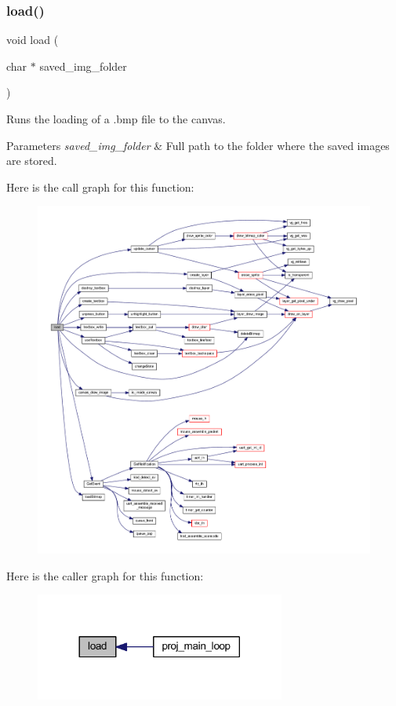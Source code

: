 \subsubsection{\texorpdfstring{load()}{load()}}
{\footnotesize\ttfamily void load (\begin{DoxyParamCaption}\item[{char $\ast$}]{saved\+\_\+img\+\_\+folder }\end{DoxyParamCaption})}



Runs the loading of a .bmp file to the canvas. 


\begin{DoxyParams}{Parameters}
{\em saved\+\_\+img\+\_\+folder} & Full path to the folder where the saved images are stored. \\
\hline
\end{DoxyParams}
Here is the call graph for this function\+:
\nopagebreak
\begin{figure}[H]
\begin{center}
\leavevmode
\includegraphics[width=350pt]{group__pengoo_ga476146a203654a545a8493d3ebeaaf70_cgraph}
\end{center}
\end{figure}
Here is the caller graph for this function\+:\nopagebreak
\begin{figure}[H]
\begin{center}
\leavevmode
\includegraphics[width=233pt]{group__pengoo_ga476146a203654a545a8493d3ebeaaf70_icgraph}
\end{center}
\end{figure}
